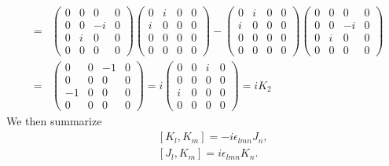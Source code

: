\documentclass[11pt]{article}
\begin{document}
\begin{eqnarray}
    [J_3,K_1]&=&
    \begin{pmatrix}
        0 & 0 & 0 & 0 \\
        0 & 0 & -i & 0 \\
        0 & i & 0 & 0 \\
        0 & 0 & 0 & 0 
    \end{pmatrix}
    \begin{pmatrix}
        0 & i & 0 & 0\\ 
        i & 0 & 0 & 0 \\
        0 & 0 & 0 & 0 \\
        0 & 0 & 0 & 0 
    \end{pmatrix}
    -
    \begin{pmatrix}
        0 & i & 0 & 0\\ 
        i & 0 & 0 & 0 \\
        0 & 0 & 0 & 0 \\
        0 & 0 & 0 & 0 
    \end{pmatrix}
    \begin{pmatrix}
        0 & 0 & 0 & 0 \\
        0 & 0 & -i & 0 \\
        0 & i & 0 & 0 \\
        0 & 0 & 0 & 0 
    \end{pmatrix} \\ 
    &=&
    \begin{pmatrix}
        0 & 0 & -1 & 0\\ 
        0 & 0 & 0 & 0 \\
        -1 & 0 & 0 & 0 \\
        0 & 0 & 0 & 0
    \end{pmatrix}
    =i
    \begin{pmatrix}
        0 & 0 & i & 0\\ 
        0 & 0 & 0 & 0 \\
        i & 0 & 0 & 0 \\
        0 & 0 & 0 & 0
    \end{pmatrix}
    =iK_2
\end{eqnarray}
We then summarize
\begin{eqnarray}
    &&[ K_l, K_m ] = -i\epsilon_{lmn} J_n, \\
    &&[ J_l, K_m ] =  i\epsilon_{lmn} K_n.
\end{eqnarray}
\end{document}
